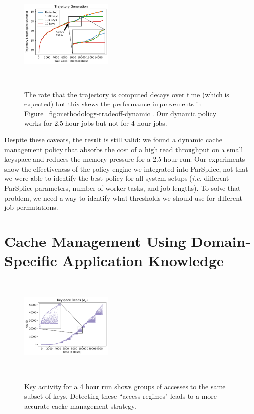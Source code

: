 \begin{figure}[t]
  \noindent\includegraphics[height=5cm,width=0.4\textwidth]{figures/methodology-trajectory.png}\\
  \caption{The rate that the trajectory is computed decays over time (which is
  expected) but this skews the performance improvements in
  Figure~\ref{fig:methodology-tradeoff-dynamic}. Our dynamic policy works for 2.5
  hour jobs but not for 4 hour jobs.  \label{fig:methodology-trajectory}}
\end{figure}

Despite these caveats, the result is still valid: we found a dynamic cache 
management policy that absorbs the cost of a high read throughput on a small
keyspace and reduces the memory pressure for a 2.5 hour run. Our experiments
show the effectiveness of the policy engine we integrated into
ParSplice, not that we were able to identify the best policy for all system
setups ({\it i.e.} different ParSplice parameters, number of worker tasks, and
job lengths).  To solve that problem, we need a way to identify what thresholds
we should use for different job permutations.

\section{Cache Management Using Domain-Specific Application Knowledge}
\label{sec:cache-management-using-domain-specific-knowledge}
\begin{figure}[t]
  \noindent\includegraphics[height=5cm,width=0.4\textwidth]{figures/keyspace-zoomed.png}\\

  \caption{Key activity for a 4 hour run shows groups of accesses to the same
  subset of keys. Detecting these ``access regimes" leads to a more accurate cache
  management strategy.\label{fig:keyspace-zoomed}}

\end{figure}

